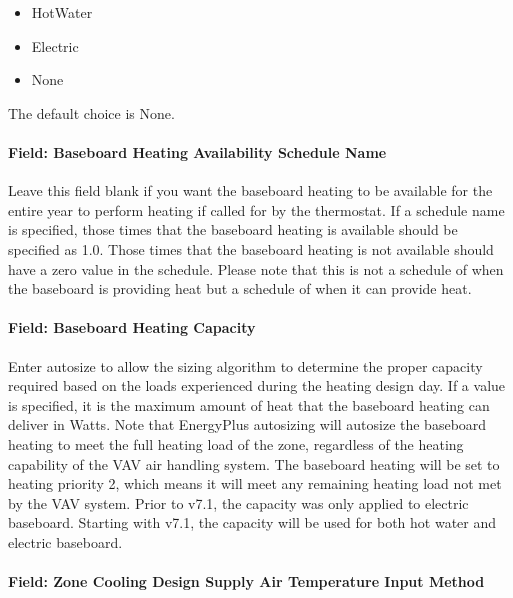 \begin{itemize}
\item
  HotWater
\item
  Electric
\item
  None
\end{itemize}

The default choice is None.

\paragraph{Field: Baseboard Heating Availability Schedule Name}\label{field-baseboard-heating-availability-schedule-name-9}

Leave this field blank if you want the baseboard heating to be available for the entire year to perform heating if called for by the thermostat. If a schedule name is specified, those times that the baseboard heating is available should be specified as 1.0. Those times that the baseboard heating is not available should have a zero value in the schedule. Please note that this is not a schedule of when the baseboard is providing heat but a schedule of when it can provide heat.

\paragraph{Field: Baseboard Heating Capacity}\label{field-baseboard-heating-capacity-9}

Enter autosize to allow the sizing algorithm to determine the proper capacity required based on the loads experienced during the heating design day. If a value is specified, it is the maximum amount of heat that the baseboard heating can deliver in Watts. Note that EnergyPlus autosizing will autosize the baseboard heating to meet the full heating load of the zone, regardless of the heating capability of the VAV air handling system. The baseboard heating will be set to heating priority 2, which means it will meet any remaining heating load not met by the VAV system. Prior to v7.1, the capacity was only applied to electric baseboard. Starting with v7.1, the capacity will be used for both hot water and electric baseboard.

\paragraph{Field: Zone Cooling Design Supply Air Temperature Input Method}\label{field-zone-cooling-design-supply-air-temperature-input-method-8}

